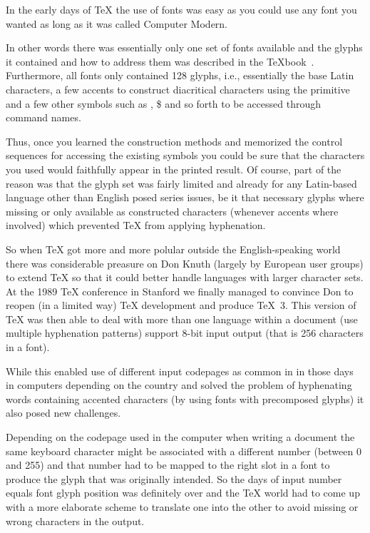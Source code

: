 \documentclass{ltugboat}
\begin{document}
In the early days of \TeX{} the use of fonts was easy as you could use
any font you wanted as long as it was called Computer Modern.

In other words there was essentially only one set of fonts available
and the glyphs it contained and how to address them was described in
the \TeX{}book~\cite{}. Furthermore, all fonts only contained 128
glyphs, i.e., essentially the base Latin characters, a few accents to
construct diacritical characters using the  primitive and a
few other symbols such as \textdagger, \$ and so forth to be accessed
through command names.

Thus, once you learned the construction methods and memorized the
control sequences for accessing the existing symbols you could be sure
that the characters you used would faithfully appear in the printed
result. Of course, part of the reason was that the glyph set was
fairly limited and already for any Latin-based language other than
English posed series issues, be it that necessary glyphs where missing
or only available as constructed characters (whenever accents where
involved) which prevented \TeX{} from applying hyphenation.

So when \TeX{} got more and more polular outside the English-speaking
world there was considerable preasure on Don Knuth (largely by
European user groups) to extend \TeX{} so that it could better handle
languages with larger character sets. At the 1989 \TeX{} conference in
Stanford we finally managed to convince Don to reopen (in a limited
way) \TeX{} development and produce \TeX~3. This version of \TeX{} was
then able to deal with more than one language within a document (use
multiple hyphenation patterns) support 8-bit input output (that is 256
characters in a font).

While this enabled use of different input codepages as common in in
those days in computers depending on the country and solved the
problem of hyphenating words containing accented characters (by using
fonts with precomposed glyphs) it also posed new challenges.

Depending on the codepage used in the computer when writing a document
the same keyboard character might be associated with a different
number (between 0 and 255) and that number had to be mapped to the
right slot in a font to produce the glyph that was originally
intended. So the days of input number equals font glyph position was
definitely over and the \TeX{} world had to come up with a more
elaborate scheme to translate one into the other to avoid missing or
wrong characters in the output.
\end{document}
